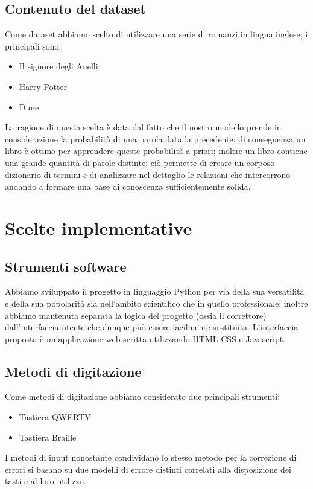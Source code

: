 \documentclass[a4paper,11pt]{article}
\begin{document}
  \subsection{Contenuto del dataset}
    Come dataset abbiamo scelto di utilizzare una serie di romanzi in lingua inglese; i principali sono:
    \begin{itemize}
     \item Il signore degli Anelli
     \item Harry Potter
     \item Dune
    \end{itemize}
    La ragione di questa scelta è data dal fatto che il nostro modello prende in considerazione
    la probabilità di una parola data la precedente; di conseguenza un libro è ottimo per apprendere queste probabilità a priori; inoltre
    un libro contiene una grande quantità di parole distinte; ciò permette di creare un corposo dizionario di termini e di analizzare nel
    dettaglio le relazioni che intercorrono andando a formare una base di conoscenza sufficientemente solida.
\newpage
\section{Scelte implementative}
	\subsection{Strumenti software}
    	Abbiamo sviluppato il progetto in linguaggio Python per via della sua versatilità e della sua popolarità sia nell'ambito scientifico che in quello
        professionale; inoltre abbiamo mantenuta separata la logica del progetto (ossia il correttore) dall'interfaccia utente che dunque può essere 
        facilmente sostituita. L'interfaccia proposta è un'applicazione web scritta utilizzando HTML CSS e Javascript.
        
	\subsection{Metodi di digitazione}
    	Come metodi di digitazione abbiamo considerato due principali strumenti: 
        \begin{itemize}
        	\item Tastiera QWERTY
            \item Tastiera Braille
        \end{itemize}
		I metodi di input nonostante condividano lo stesso metodo per la correzione di errori si basano su due modelli di errore
        distinti correlati alla disposizione dei tasti e al loro utilizzo.
\end{document}
